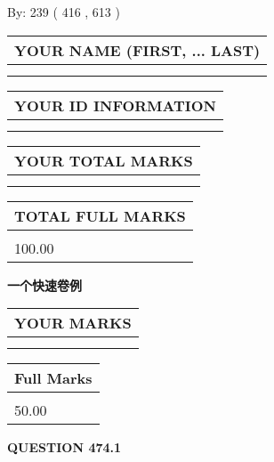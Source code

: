 \documentclass{ctexart}
\begin{document}
   
\hspace{1.0in} By: 
 239 ( 416 ,  613 )
   
   
   
   
\newpage 
\setcounter{page}{ 
   474001 } 
   
   
   
   
\noindent\begin{tabular}{|l|}
\hline
YOUR NAME (FIRST, ... LAST)  \\
\hline
 \\ 
 \\ 
\hline
\end{tabular}
\hspace{0.05in} \begin{tabular}{|l|}
\hline
 YOUR   ID   INFORMATION  \\
\hline
 \\ 
 \\ 
\hline
\end{tabular}
   
   
\vspace{0.2in}\noindent\begin{tabular}{|l|}
\hline
YOUR TOTAL MARKS  \\
\hline
 \\ 
 \\ 
\hline
\end{tabular}
\hspace{0.05in} \begin{tabular}{|l|}
\hline
TOTAL FULL MARKS  \\
\hline
 \\ 
100.00 \\
\hline
\end{tabular}
   
   
 \vspace{0.2in}
{\LARGE {\textbf{ 一个快速卷例}}}
   
   
  
\vspace{0.2in}
  
\noindent\begin{tabular}{|l|}
\hline
 YOUR MARKS  \\
\hline
 \\ 
 \\ 
\hline
\end{tabular}
\hspace{0.05in} \begin{tabular}{|l|}
\hline
 Full Marks  \\
\hline
 \\ 
50.00 \\
\hline
\end{tabular}
{\textbf{\Large{QUESTION
474.1 
}}}
  
\end{document}
